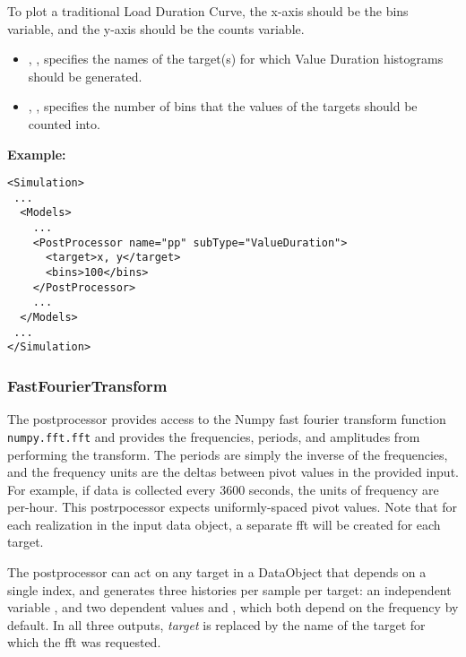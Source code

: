 To plot a traditional Load Duration Curve, the x-axis should be the bins variable, and the y-axis should be
the counts variable.

%
\begin{itemize}
  \item {}, , specifies the names of the
    target(s) for which Value Duration histograms should be generated.
  \item {}, , specifies the number of bins that the values of the
    targets should be counted into.
\end{itemize}

\textbf{Example:}

\begin{lstlisting}[style=XML]
<Simulation>
 ...
  <Models>
    ...
    <PostProcessor name="pp" subType="ValueDuration">
      <target>x, y</target>
      <bins>100</bins>
    </PostProcessor>
    ...
  </Models>
 ...
</Simulation>
\end{lstlisting}

\subsubsection{FastFourierTransform}
\label{FastFourierTransformPP}
The  postprocessor provides access to the Numpy fast fourier transform function
\texttt{numpy.fft.fft}
and provides the frequencies, periods, and amplitudes from performing the transform. The periods are simply
the inverse of the frequencies, and the frequency units are the deltas between pivot values in the provided
input. For example, if data is collected every 3600 seconds, the units of frequency are per-hour.  This
postrpocessor expects uniformly-spaced pivot values. Note that for each realization in the input data object,
a separate fft will be created for each target.

The  postprocessor can act on any target in a DataObject that depends on a
single index, and generates three histories per sample per target: an independent variable
, and two dependent values  and
, which both depend on the frequency by default. In all three outputs,
\emph{target} is replaced by the name of the target for which the fft was requested.

